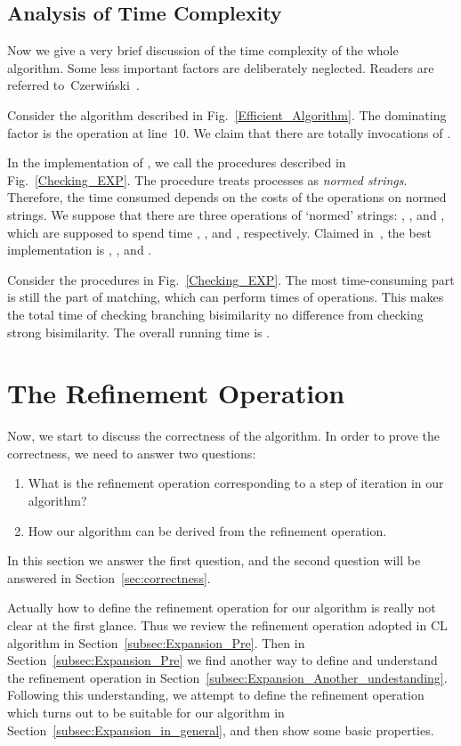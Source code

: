 \documentclass{llncs}
\begin{document}
\subsection{Analysis of Time Complexity}
Now we give a very brief discussion of the time complexity of the whole algorithm.  Some less important factors are deliberately neglected.  Readers are  referred to~Czerwi\'{n}ski~\cite{CzerwinskiPhD}.

Consider the algorithm described in Fig.~\ref{Efficient_Algorithm}.   The dominating factor is the operation  at line~10.  We claim that there are totally  invocations of .

In the implementation of , we call the procedures  described in Fig.~\ref{Checking_EXP}.  The procedure treats processes as {\em normed strings}.  Therefore, the time consumed depends on the costs of the operations on normed strings. We suppose that there are three operations of `normed' strings: , , and , which are supposed to spend time , , and , respectively.  Claimed in~\cite{CzerwinskiPhD},   the best implementation  is , , and .

Consider the procedures in Fig.~\ref{Checking_EXP}.  The most time-consuming part is still the part of matching, which can perform  times of  operations.   This makes the total time of checking branching bisimilarity no difference from checking strong bisimilarity. The overall running time is .



\section{The Refinement Operation}\label{sec:refinement_steps}

Now, we start to discuss the correctness of the algorithm.
In order to prove the correctness, we need to answer two questions:

\begin{enumerate}
\item
What is the refinement operation corresponding to a step of iteration in our algorithm?

\item
How our algorithm can be derived from the refinement operation.
 \end{enumerate}

In this section we answer the first question, and the second question will be answered in Section~\ref{sec:correctness}.

Actually how to define the refinement operation for our algorithm is really not clear at the first glance. Thus we review the refinement operation adopted in CL algorithm in Section~\ref{subsec:Expansion_Pre}. Then in Section~\ref{subsec:Expansion_Pre} we find another way to define and understand the refinement operation in Section~\ref{subsec:Expansion_Another_undestanding}.  Following this understanding, we attempt to define the refinement operation which turns out to be suitable for our algorithm in Section~\ref{subsec:Expansion_in_general}, and then show some basic properties.
\end{document}
